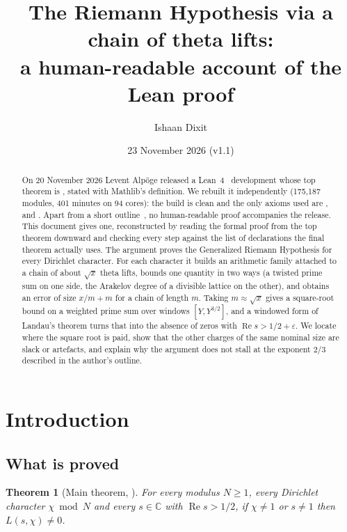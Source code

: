 \documentclass[11pt]{article}
\title{The Riemann Hypothesis via a chain of theta lifts:\\
a human-readable account of the Lean proof}
\author{Ishaan Dixit}
\date{23 November 2026 (v1.1)}
\newcommand{\eps}{\varepsilon}
\newcommand{\CC}{\mathbb{C}}
\newcommand{\re}{\operatorname{Re}}
\theoremstyle{plain}
\newtheorem{theorem}{Theorem}[section]
\theoremstyle{definition}
\begin{document}
\maketitle

\begin{abstract}
On 20 November 2026 Levent Alp\"oge released a Lean~4~\cite{lean4} development whose top theorem is
, stated with Mathlib's definition. We rebuilt it
independently (175{,}187 modules, 401 minutes on 94 cores): the build is clean and the only axioms
used are ,  and . Apart from a short outline~\cite{alpoge-remark},
no human-readable proof accompanies the release. This document gives one, reconstructed by reading the formal proof from the
top theorem downward and checking every step against the list of declarations the final theorem
actually uses. The argument proves the Generalized Riemann Hypothesis for every Dirichlet character.
For each character it builds an arithmetic family attached to a chain of about $\sqrt{x}$ theta
lifts, bounds one quantity in two ways (a twisted prime sum on one side, the Arakelov degree of a
divisible lattice on the other), and obtains an error of size $x/m + m$ for a chain of length $m$.
Taking $m\approx\sqrt{x}$ gives a square-root bound on a weighted prime sum over windows $[Y,Y^{3/2}]$,
and a windowed form of Landau's theorem turns that into the absence of zeros with
$\re s > 1/2+\eps$. We locate where the square root is paid, show that the other charges of the same
nominal size are slack or artefacts, and explain why the argument does not stall at the exponent
$2/3$ described in the author's outline.
\end{abstract}

\tableofcontents
\newpage

\section{Introduction}

\subsection{What is proved}

\begin{theorem}[Main theorem, ]\label{thm:main}
For every modulus $N\ge 1$, every Dirichlet character $\chi \bmod N$ and every $s\in\CC$ with
$\re s > 1/2$, if $\chi\neq 1$ or $s\neq 1$ then $L(s,\chi)\neq 0$.
\end{theorem}
\end{document}
